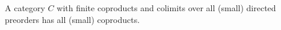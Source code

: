 A category $C$ with finite coproducts and colimits over all (small) directed preorders has all (small) coproducts.
